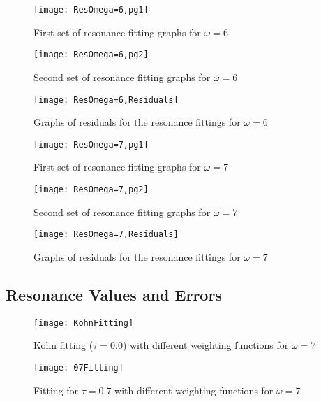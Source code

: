 \documentclass[Dissertation.tex]{subfiles}
\begin{document}
\begin{figure}[H]
	\centering
	\texttt{[image: ResOmega=6,pg1]}
	\caption{First set of resonance fitting graphs for $\omega = 6$}
	\label{fig:ResOmega=6,pg1}
\end{figure}

\begin{figure}[H]
	\centering
	\texttt{[image: ResOmega=6,pg2]}
	\caption{Second set of resonance fitting graphs for $\omega = 6$}
	\label{fig:ResOmega=6,pg2}
\end{figure}

\begin{figure}[H]
	\centering
	\texttt{[image: ResOmega=6,Residuals]}
	\caption{Graphs of residuals for the resonance fittings for $\omega = 6$}
	\label{fig:ResOmega=6,Residuals}
\end{figure}

\begin{figure}[H]
	\centering
	\texttt{[image: ResOmega=7,pg1]}
	\caption{First set of resonance fitting graphs for $\omega = 7$}
	\label{fig:ResOmega=7,pg1}
\end{figure}

\begin{figure}[H]
	\centering
	\texttt{[image: ResOmega=7,pg2]}
	\caption{Second set of resonance fitting graphs for $\omega = 7$}
	\label{fig:ResOmega=7,pg2}
\end{figure}

\begin{figure}[H]
	\centering
	\texttt{[image: ResOmega=7,Residuals]}
	\caption{Graphs of residuals for the resonance fittings for $\omega = 7$}
	\label{fig:ResOmega=7,Residuals}
\end{figure}


\subsection{Resonance Values and Errors}
\label{sec:ResonanceErrors}

\begin{figure}[H]
	\centering
	\texttt{[image: KohnFitting]}
	\caption{Kohn fitting ($\tau = 0.0$) with different weighting functions for $\omega = 7$}
	\label{fig:KohnFitting}
\end{figure}

\begin{figure}[H]
	\centering
	\texttt{[image: 07Fitting]}
	\caption{Fitting for $\tau = 0.7$ with different weighting functions for $\omega = 7$}
	\label{fig:07Fitting}
\end{figure}
\end{document}
